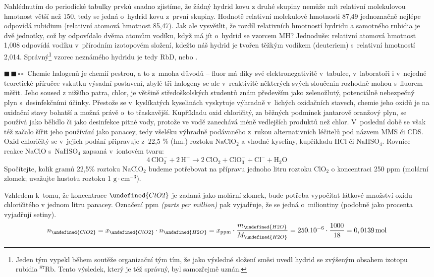 \documentclass{book}
\let\ch\undefined
\newcommand{\dva}{$\blacksquare \, \blacksquare \, \square \, \square \; \; $}
\renewenvironment{quotation}{\par}{\par} %
\begin{document}
Nahlédnutím do periodické tabulky prvků snadno zjistíme, že žádný hydrid kovu
z druhé skupiny nemůže mít relativní molekulovou hmotnost větší než
150, tedy se jedná o~hydrid kovu z~první skupiny. Hodnotě relativní
molekulové hmotnosti 87,49 jednoznačně nejlépe odpovídá rubidium (relativní
atomová hmotnost 85,47). Jak ale vysvětlit, že rozdíl relativních
hmotností hydridu a samotného rubidia je dvě jednotky, což by odpovídalo
dvěma atomům vodíku, když má jít o~hydrid se vzorcem MH? Jednoduše:
relativní atomová hmotnost 1,008 odpovídá vodíku v~přírodním izotopovém
složení, kdežto náš hydrid je tvořen těžkým vodíkem (deuteriem) s~relativní hmotností 2,014. Správný\footnote{Jeden tým vypekl během soutěže organizační tým tím, že jako výsledné složení směsi uvedl hydrid se zvýšeným obsahem izotopu rubidia $^{87}\mathrm{Rb}$. Tento výsledek, který je též správný, byl samozřejmě uznán.} vzorec neznámého hydridu je tedy
RbD, \ch{Rb^{2}_{}D} nebo \ch{Rb^{2}_{}H}.

\hrulefill %
\begin{quotation}
\dva Chemie halogenů je chemií pestrou, a to z~mnoha důvodů -- fluor má
díky své elektronegativitě v~tabulce, v~laboratoři i v~nejedné teoretické
příručce vskutku výsadní postavení, zbylé tři halogeny se ale v~reaktivitě
některých svých sloučenin rozhodně mohou s~fluorem měřit. Jeho soused
z nižšího patra, chlor, je většině středoškolských studentů znám především
jako zelenožlutý, potenciálně nebezpečný plyn s~desinfekčními účinky.
Přestože se v~kyslíkatých kyselinách vyskytuje výhradně v~lichých
oxidačních stavech, chemie jeho oxidů je na oxidační stavy bohatší
a možná právě o~to třaskavější. Kupříkladu oxid chloričitý, za běžných
podmínek jantarově oranžový plyn, se používá jako bělidlo či jako
desinfekce pitné vody, protože ve vodě zanechává méně vedlejších produktů
než chlor. V~poslední době se však též začalo šířit jeho používání
jako panacey, tedy všeléku výhradně podávaného z~rukou alternativních
léčitelů pod názvem MMS či CDS. Oxid chloričitý se v~jejich podání
připravuje z~22,5 \% (hm.) roztoku $\mathrm{NaClO_{2}}$ a vhodné
kyseliny, kupříkladu HCl či $\mathrm{NaHSO_{4}}$. Rovnice reakce
NaClO s~$\mathrm{NaHSO_{4}}$ zapsaná v~iontovém tvaru: 
\[
\mathrm{4\,ClO_{2}^{-}+2\,H^{+}\rightarrow2\,ClO_{2}+ClO_{3}^{-}+Cl^{-}+H_{2}O}
\]
Spočítejte, kolik gramů 22,5\% roztoku $\mathrm{NaClO_{2}}$ budeme
potřebovat na přípravu jednoho litru roztoku $\mathrm{ClO_{2}}$ o
koncentraci 250 ppm (molární zlomek; uvažujte hustotu roztoku 1 $\mathrm{g\cdot cm^{-3}}$).
\end{quotation} \dotfill \par 
Vzhledem k~tomu, že koncentrace $\ch{ClO2}$ je zadaná jako molární zlomek, bude potřeba vypočítat látkové množství oxidu chloričitého
v jednom litru panacey. Označení ppm \textit{(parts per million)} pak vyjadřuje, že se jedná o~miliontiny (podobně jako procenta vyjadřují setiny).
\[
n_{\ch{ClO2}}=x_{\ch{ClO2}}\cdot n_{\ch{H2O}}=x_{\mathrm{ppm}}\cdot\frac{m_{\ch{H2O}}}{M_{\ch{H2O}}}=250.10^{-6}\cdot\frac{1000}{18}=0,0139\, \mathrm{mol}
\]
\end{document}
